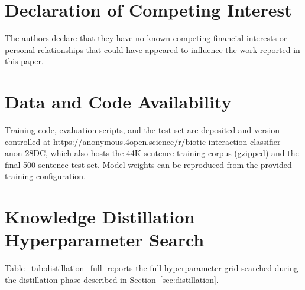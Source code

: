 \documentclass[a4paper,fleqn]{cas-sc}
\begin{document}
\section*{Declaration of Competing Interest}

The authors declare that they have no known competing financial interests
or personal relationships that could have appeared to influence the work
reported in this paper.

\section*{Data and Code Availability}

Training code, evaluation scripts, and the test set are deposited and
version-controlled at
\url{https://anonymous.4open.science/r/biotic-interaction-classifier-anon-28DC},
which also hosts the 44K-sentence training corpus (gzipped) and the final
500-sentence test set. Model weights can be reproduced from the provided
training configuration.




\clearpage
\onecolumn
\appendix

\FloatBarrier
\section{Knowledge Distillation Hyperparameter Search}
\label{app:distillation}

Table~\ref{tab:distillation_full} reports the full hyperparameter grid
searched during the distillation phase described in
Section~\ref{sec:distillation}.
\end{document}

